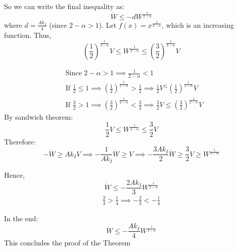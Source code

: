 So we can write the final inequality as:
\begin{equation}
\dot{W} \leq -d W^{\frac{1}{2-\alpha}}
\end{equation}
where \(d = \frac{A k_I}{4}\) (since \(2-\alpha > 1\)).
Let \(f(x) = x^{\frac{1}{2-\alpha}}\), which is an increasing function.
Thus,
\begin{equation}
\left(\frac{1}{2}\right)^{\frac{1}{2-\alpha}} V \leq W^{\frac{1}{2-\alpha}} \leq \left(\frac{3}{2}\right)^{\frac{1}{2-\alpha}} V
\end{equation}

\begin{align*}
&\text{Since } 2 - \alpha > 1 \implies \frac{1}{2-\alpha} < 1 \\
&\text{If } \frac{1}{2} \leq 1 \implies \left(\frac{1}{2}\right)^{\frac{1}{2-\alpha}} > \frac{1}{2} \implies \frac{1}{2} V^ \leq \left(\frac{1}{2}\right)^{\frac{1}{2-\alpha}} V \\
&\text{If } \frac{3}{2} > 1 \implies \left(\frac{3}{2}\right)^{\frac{1}{2-\alpha}} < \frac{3}{2} \implies \frac{3}{2} V \leq  \left(\frac{3}{2}\right)^{\frac{1}{2-\alpha}} V
\end{align*}
By sandwich theorem:
\begin{equation}
\frac{1}{2} V\leq W^{\frac{1}{2-\alpha}} \leq \frac{3}{2} V
\end{equation}
Therefore:
\begin{equation}
-\dot{W} \geq A k_I V \implies -\frac{1}{A k_I}\dot{W} \geq V \implies -\frac{3 A k_I}{2} \dot{W} \geq \frac{3}{2} V \geq W^{\frac{1}{2-\alpha}}
\end{equation}

Hence,
\begin{equation}
\dot{W} \leq -\frac{2 A k_I}{3} W^{\frac{1}{2-\alpha}}
\end{equation}
\begin{align}
    \frac{2}{3} > \frac{1}{4} \implies -\frac{2}{3} < -\frac{1}{4}
\end{align}

In the end:
\begin{equation}
\dot{W} \leq -\frac{A k_I}{4} W^{\frac{1}{2-\alpha}}
\end{equation}
This concludes the proof of the Theorem 

